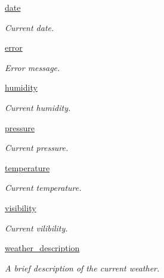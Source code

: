 \begin{DoxyCompactItemize}
\item 
\hyperlink{classRappCloud_1_1CloudMsgs_1_1WeatherReportCurrent_1_1WeatherReportCurrent_1_1Response_a7978fc9a561a264ee359a6d9a2b6646d}{date}
\begin{DoxyCompactList}\small\item\em Current date. \end{DoxyCompactList}\item 
\hyperlink{classRappCloud_1_1CloudMsgs_1_1WeatherReportCurrent_1_1WeatherReportCurrent_1_1Response_a8d3179a2b4db5abccfeab7492e1cfa42}{error}
\begin{DoxyCompactList}\small\item\em Error message. \end{DoxyCompactList}\item 
\hyperlink{classRappCloud_1_1CloudMsgs_1_1WeatherReportCurrent_1_1WeatherReportCurrent_1_1Response_aec8bf35b5719955810af5f60937fbc33}{humidity}
\begin{DoxyCompactList}\small\item\em Current humidity. \end{DoxyCompactList}\item 
\hyperlink{classRappCloud_1_1CloudMsgs_1_1WeatherReportCurrent_1_1WeatherReportCurrent_1_1Response_a7fc449dcfc75adac06186b75e1fb3aec}{pressure}
\begin{DoxyCompactList}\small\item\em Current pressure. \end{DoxyCompactList}\item 
\hyperlink{classRappCloud_1_1CloudMsgs_1_1WeatherReportCurrent_1_1WeatherReportCurrent_1_1Response_aa4b017ec67179aa406ead6441237a229}{temperature}
\begin{DoxyCompactList}\small\item\em Current temperature. \end{DoxyCompactList}\item 
\hyperlink{classRappCloud_1_1CloudMsgs_1_1WeatherReportCurrent_1_1WeatherReportCurrent_1_1Response_a14437cad48eb56b02ce5ef9a96a8cad6}{visibility}
\begin{DoxyCompactList}\small\item\em Current vilibility. \end{DoxyCompactList}\item 
\hyperlink{classRappCloud_1_1CloudMsgs_1_1WeatherReportCurrent_1_1WeatherReportCurrent_1_1Response_aace5374d6050b29773fc8d8107056478}{weather\-\_\-description}
\begin{DoxyCompactList}\small\item\em A brief description of the current weather. \end{DoxyCompactList}\item 

\end{DoxyCompactItemize}
